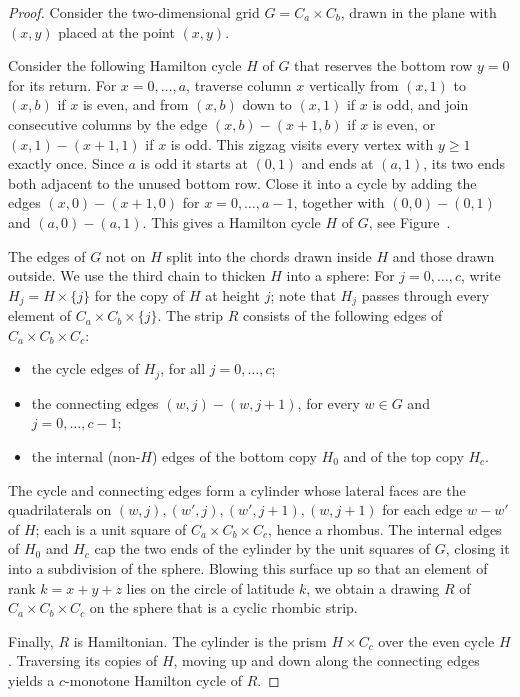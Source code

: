 \documentclass[fontsize=11pt,a4paper,DIV=12]{scrartcl}
\begin{document}
\begin{proof}
Consider the two-dimensional grid $G = C_a \times C_b$, drawn in the plane with
$(x,y)$ placed at the point $(x,y)$.

Consider the following Hamilton cycle $H$ of $G$ that reserves the bottom row $y = 0$ for its
return. For $x = 0, \dots, a$, traverse column $x$ vertically from $(x,1)$ to
$(x,b)$ if $x$ is even, and from $(x,b)$ down to $(x,1)$ if $x$ is odd, and join
consecutive columns by the edge $(x,b) - (x+1,b)$ if $x$ is even, or
$(x,1) - (x{+}1,1)$ if $x$ is odd. This zigzag visits every vertex with $y \geq 1$
exactly once. Since $a$ is odd it starts at $(0,1)$ and ends at $(a,1)$, its two ends
both adjacent to the unused bottom row. Close it into a cycle by adding the
edges $(x,0) - (x{+}1,0)$ for $x = 0, \dots, a-1$, together with $(0,0) - (0,1)$ and
$(a,0) - (a,1)$. This gives a Hamilton cycle $H$ of $G$, see Figure~.

The edges of $G$ not on $H$ split into the chords drawn inside $H$ and those drawn
outside. We use the third chain to thicken $H$ into a sphere: For $j = 0, \dots, c$, write
$H_j = H \times \{j\}$ for the copy of $H$ at height $j$; note that $H_j$ passes
through every element of $C_a \times C_b \times \{j\}$. The strip $R$ consists of the
following edges of $C_a \times C_b \times C_c$:
\begin{itemize}
    \item the cycle edges of $H_j$, for all $j = 0, \dots, c$;
    \item the connecting edges $(w,j) - (w,j+1)$, for every $w \in G$ and
        $j = 0, \dots, c-1$;
    \item the internal (non-$H$) edges of the bottom copy $H_0$ and of the top copy
        $H_c$.
\end{itemize}

The cycle and connecting edges form a cylinder whose lateral faces are the
quadrilaterals on $(w,j), (w',j), (w',j+1), (w,j+1)$ for each edge $w-w'$ of $H$;
each is a unit square of $C_a \times C_b \times C_c$, hence a rhombus. The internal
edges of $H_0$ and $H_c$ cap the two ends of the cylinder by the unit squares of $G$,
closing it into a subdivision of the sphere. Blowing this surface up so that an
element of rank $k = x+y+z$ lies on the circle of latitude $k$, we obtain a drawing
$R$ of $C_a \times C_b \times C_c$ on the sphere that is a cyclic rhombic strip.

Finally, $R$ is Hamiltonian. The cylinder is the prism $H \times C_c$ over the even
cycle $H$. Traversing its copies of $H$, moving up and
down along the connecting edges yields a $c$-monotone Hamilton cycle of $R$.
\end{proof}
\end{document}
